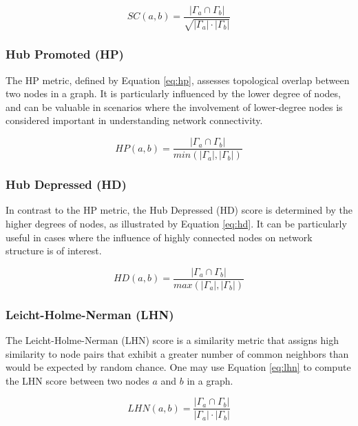 \begin{equation}
\label{eq:sc}
  SC(a, b) = \frac{|\Gamma_a \cap \Gamma_b|}{\sqrt{|\Gamma_a| \cdot |\Gamma_b|}}
\end{equation}


\subsubsection{Hub Promoted (HP)}

The HP \cite{liben2003link} metric, defined by Equation \ref{eq:hp}, assesses topological overlap between two nodes in a graph. It is particularly influenced by the lower degree of nodes, and can be valuable in scenarios where the involvement of lower-degree nodes is considered important in understanding network connectivity.

\begin{equation}
\label{eq:hp}
  HP(a, b) = \frac{|\Gamma_a \cap \Gamma_b|}{min(|\Gamma_a|, |\Gamma_b|)}
\end{equation}


\subsubsection{Hub Depressed (HD)}

In contrast to the HP metric, the Hub Depressed (HD) score \cite{zhou2009predicting} is determined by the higher degrees of nodes, as illustrated by Equation \ref{eq:hd}. It can be particularly useful in cases where the influence of highly connected nodes on network structure is of interest.

\begin{equation}
\label{eq:hd}
  HD(a, b) = \frac{|\Gamma_a \cap \Gamma_b|}{max(|\Gamma_a|, |\Gamma_b|)}
\end{equation}


\subsubsection{Leicht-Holme-Nerman (LHN)}

The Leicht-Holme-Nerman (LHN) score \cite{leicht2006vertex} is a similarity metric that assigns high similarity to node pairs that exhibit a greater number of common neighbors than would be expected by random chance. One may use Equation \ref{eq:lhn} to compute the LHN score between two nodes $a$ and $b$ in a graph.

\begin{equation}
\label{eq:lhn}
  LHN(a, b) = \frac{|\Gamma_a \cap \Gamma_b|}{|\Gamma_a| \cdot |\Gamma_b|}
\end{equation}


